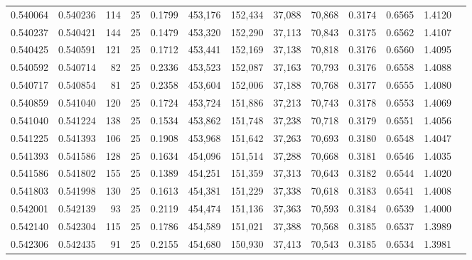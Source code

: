 \begin{tabular}{rrrrrrrrrrrrr}
0.540064 & 0.540236 &   114 &  25 &                                     0.1799 & 453,176 & 152,434 &  37,088 &  70,868 & 0.3174 & 0.6565 & 1.4120 \\
0.540237 & 0.540421 &   144 &  25 &                                     0.1479 & 453,320 & 152,290 &  37,113 &  70,843 & 0.3175 & 0.6562 & 1.4107 \\
0.540425 & 0.540591 &   121 &  25 &                                     0.1712 & 453,441 & 152,169 &  37,138 &  70,818 & 0.3176 & 0.6560 & 1.4095 \\
0.540592 & 0.540714 &    82 &  25 &                                     0.2336 & 453,523 & 152,087 &  37,163 &  70,793 & 0.3176 & 0.6558 & 1.4088 \\
0.540717 & 0.540854 &    81 &  25 &                                     0.2358 & 453,604 & 152,006 &  37,188 &  70,768 & 0.3177 & 0.6555 & 1.4080 \\
0.540859 & 0.541040 &   120 &  25 &                                     0.1724 & 453,724 & 151,886 &  37,213 &  70,743 & 0.3178 & 0.6553 & 1.4069 \\
0.541040 & 0.541224 &   138 &  25 &                                     0.1534 & 453,862 & 151,748 &  37,238 &  70,718 & 0.3179 & 0.6551 & 1.4056 \\
0.541225 & 0.541393 &   106 &  25 &                                     0.1908 & 453,968 & 151,642 &  37,263 &  70,693 & 0.3180 & 0.6548 & 1.4047 \\
0.541393 & 0.541586 &   128 &  25 &                                     0.1634 & 454,096 & 151,514 &  37,288 &  70,668 & 0.3181 & 0.6546 & 1.4035 \\
0.541586 & 0.541802 &   155 &  25 &                                     0.1389 & 454,251 & 151,359 &  37,313 &  70,643 & 0.3182 & 0.6544 & 1.4020 \\
0.541803 & 0.541998 &   130 &  25 &                                     0.1613 & 454,381 & 151,229 &  37,338 &  70,618 & 0.3183 & 0.6541 & 1.4008 \\
0.542001 & 0.542139 &    93 &  25 &                                     0.2119 & 454,474 & 151,136 &  37,363 &  70,593 & 0.3184 & 0.6539 & 1.4000 \\
0.542140 & 0.542304 &   115 &  25 &                                     0.1786 & 454,589 & 151,021 &  37,388 &  70,568 & 0.3185 & 0.6537 & 1.3989 \\
0.542306 & 0.542435 &    91 &  25 &                                     0.2155 & 454,680 & 150,930 &  37,413 &  70,543 & 0.3185 & 0.6534 & 1.3981 \\

\end{tabular}
